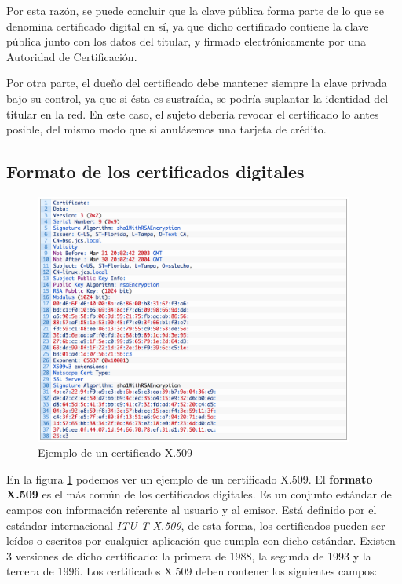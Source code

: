 \documentclass{manual}
\begin{document}
Por esta razón, se puede concluir que la clave pública forma parte de lo que se denomina certificado digital en sí, ya que dicho certificado contiene la clave pública junto con los datos del titular, y firmado electrónicamente por una Autoridad de Certificación. 

Por otra parte, el dueño del certificado debe mantener siempre la clave privada bajo su control, ya que si ésta es sustraída, se podría suplantar la identidad del titular en la red. En este caso, el sujeto debería revocar el certificado lo antes posible, del mismo modo que si anulásemos una tarjeta de crédito.


\subsection{Formato de los certificados digitales}

\begin{figure}[H]
	\centering
	\includegraphics[width=105mm]{images/x509}
	\caption{Ejemplo de un certificado X.509} 
	\label{tipo}
\end{figure}

En la figura \ref{tipo} podemos ver un ejemplo de un certificado X.509. El \textbf{formato X.509} es el más común de los certificados digitales. Es un conjunto estándar de campos con información referente al usuario y al emisor. Está definido por el estándar internacional \textit{ITU-T X.509}, de esta forma, los certificados pueden ser leídos o escritos por cualquier aplicación que cumpla con dicho estándar. Existen 3 versiones de dicho certificado: la primera de 1988, la segunda de 1993 y la tercera de 1996. Los certificados X.509 deben contener los siguientes campos:
\end{document}
